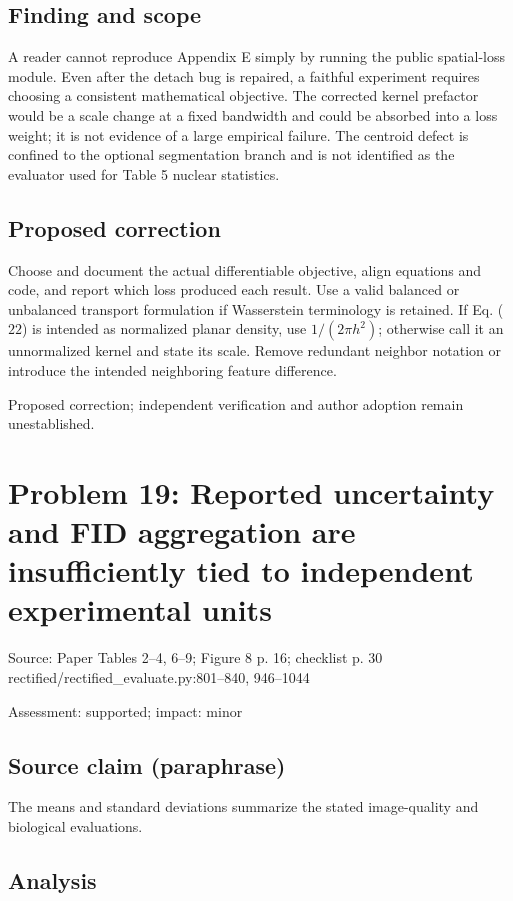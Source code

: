 \documentclass[11pt]{article}
\begin{document}
\subsection*{Finding and scope}

A reader cannot reproduce Appendix E simply by running the public spatial-loss module. Even after the detach bug is repaired, a faithful experiment requires choosing a consistent mathematical objective. The corrected kernel prefactor would be a scale change at a fixed bandwidth and could be absorbed into a loss weight; it is not evidence of a large empirical failure. The centroid defect is confined to the optional segmentation branch and is not identified as the evaluator used for Table 5 nuclear statistics.

\subsection*{Proposed correction}

Choose and document the actual differentiable objective, align equations and code, and report which loss produced each result. Use a valid balanced or unbalanced transport formulation if Wasserstein terminology is retained. If Eq. (\(22\)) is intended as normalized planar density, use \(1/(2\pi h^2)\); otherwise call it an unnormalized kernel and state its scale. Remove redundant neighbor notation or introduce the intended neighboring feature difference.

Proposed correction; independent verification and author adoption remain unestablished.

\section*{Problem 19: Reported uncertainty and FID aggregation are insufficiently tied to independent experimental units}

Source: Paper Tables 2–4, 6–9; Figure 8 p. 16; checklist p. 30 rectified/rectified\_evaluate.py:801–840, 946–1044

Assessment: supported; impact: minor

\subsection*{Source claim (paraphrase)}

The means and standard deviations summarize the stated image-quality and biological evaluations.

\subsection*{Analysis}
\end{document}
